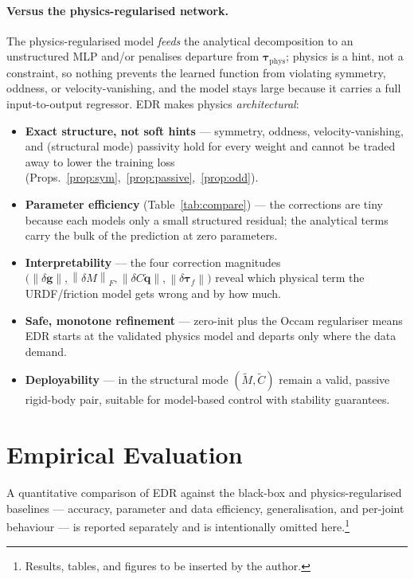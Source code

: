 \documentclass[11pt]{article}
\newcommand{\qd}{\dot{\bm{q}}}
\newcommand{\tphys}{\bm{\tau}_{\mathrm{phys}}}
\newcommand{\dg}{\delta\bm{g}}
\newcommand{\dM}{\delta\!M}
\newcommand{\dC}{\delta C}
\newcommand{\dtf}{\delta\bm{\tau}_f}
\newcommand{\Mt}{\tilde{M}}
\newcommand{\Ct}{\tilde{C}}
\newcommand{\norm}[1]{\left\lVert #1 \right\rVert}
\theoremstyle{definition}
\theoremstyle{plain}
\begin{document}
\paragraph{Versus the physics-regularised network.}
The physics-regularised model \emph{feeds} the analytical decomposition to an
unstructured MLP and/or penalises departure from $\tphys$; physics is a hint, not
a constraint, so nothing prevents the learned function from violating symmetry,
oddness, or velocity-vanishing, and the model stays large because it carries a
full input-to-output regressor. EDR makes physics \emph{architectural}:
\begin{itemize}[leftmargin=1.5em,itemsep=2pt]
  \item \textbf{Exact structure, not soft hints} --- symmetry, oddness,
  velocity-vanishing, and (structural mode) passivity hold for every weight and
  cannot be traded away to lower the training loss
  (Props.~\ref{prop:sym},~\ref{prop:passive},~\ref{prop:odd}).
  \item \textbf{Parameter efficiency} (Table~\ref{tab:compare}) --- the
  corrections are tiny because each models only a small structured residual; the
  analytical terms carry the bulk of the prediction at zero parameters.
  \item \textbf{Interpretability} --- the four correction magnitudes
  $\big(\norm{\dg},\norm{\dM}_F,\norm{\dC\qd},\norm{\dtf}\big)$ reveal which
  physical term the URDF/friction model gets wrong and by how much.
  \item \textbf{Safe, monotone refinement} --- zero-init plus the Occam
  regulariser means EDR starts at the validated physics model and departs only
  where the data demand.
  \item \textbf{Deployability} --- in the structural mode $(\Mt,\Ct)$ remain a
  valid, passive rigid-body pair, suitable for model-based control with stability
  guarantees.
\end{itemize}

\section{Empirical Evaluation}
A quantitative comparison of EDR against the black-box and physics-regularised
baselines --- accuracy, parameter and data efficiency, generalisation, and
per-joint behaviour --- is reported separately and is intentionally omitted
here.\footnote{Results, tables, and figures to be inserted by the author.}
\end{document}
